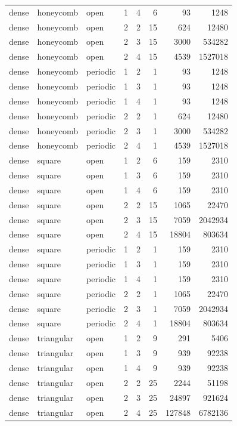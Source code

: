 \begin{table}
\begin{tabular}{llllrrrr}
dense & honeycomb & open & 1 & 4 & 6 & 93 & 1248 \\
dense & honeycomb & open & 2 & 2 & 15 & 624 & 12480 \\
dense & honeycomb & open & 2 & 3 & 15 & 3000 & 534282 \\
dense & honeycomb & open & 2 & 4 & 15 & 4539 & 1527018 \\
dense & honeycomb & periodic & 1 & 2 & 1 & 93 & 1248 \\
dense & honeycomb & periodic & 1 & 3 & 1 & 93 & 1248 \\
dense & honeycomb & periodic & 1 & 4 & 1 & 93 & 1248 \\
dense & honeycomb & periodic & 2 & 2 & 1 & 624 & 12480 \\
dense & honeycomb & periodic & 2 & 3 & 1 & 3000 & 534282 \\
dense & honeycomb & periodic & 2 & 4 & 1 & 4539 & 1527018 \\
dense & square & open & 1 & 2 & 6 & 159 & 2310 \\
dense & square & open & 1 & 3 & 6 & 159 & 2310 \\
dense & square & open & 1 & 4 & 6 & 159 & 2310 \\
dense & square & open & 2 & 2 & 15 & 1065 & 22470 \\
dense & square & open & 2 & 3 & 15 & 7059 & 2042934 \\
dense & square & open & 2 & 4 & 15 & 18804 & 803634 \\
dense & square & periodic & 1 & 2 & 1 & 159 & 2310 \\
dense & square & periodic & 1 & 3 & 1 & 159 & 2310 \\
dense & square & periodic & 1 & 4 & 1 & 159 & 2310 \\
dense & square & periodic & 2 & 2 & 1 & 1065 & 22470 \\
dense & square & periodic & 2 & 3 & 1 & 7059 & 2042934 \\
dense & square & periodic & 2 & 4 & 1 & 18804 & 803634 \\
dense & triangular & open & 1 & 2 & 9 & 291 & 5406 \\
dense & triangular & open & 1 & 3 & 9 & 939 & 92238 \\
dense & triangular & open & 1 & 4 & 9 & 939 & 92238 \\
dense & triangular & open & 2 & 2 & 25 & 2244 & 51198 \\
dense & triangular & open & 2 & 3 & 25 & 24897 & 921624 \\
dense & triangular & open & 2 & 4 & 25 & 127848 & 6782136 \\

\end{tabular}
\end{table}

